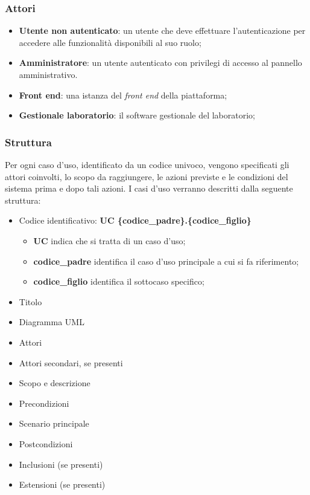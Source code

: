 \subsubsection{Attori}
\begin{itemize}
    \item \textbf{Utente non autenticato}: un utente che deve effettuare l'autenticazione per accedere alle funzionalità disponibili al suo ruolo;
    \item \textbf{Amministratore}: un utente autenticato con privilegi di accesso al pannello amministrativo.
    \item \textbf{Front end}: una istanza del \textit{front end} della piattaforma;
    \item \textbf{Gestionale laboratorio}: il software gestionale del laboratorio;
\end{itemize}
\vspace{-12pt}
\subsubsection{Struttura}
Per ogni caso d'uso, identificato da un codice univoco, vengono specificati gli attori coinvolti, lo scopo da raggiungere, le azioni previste e le condizioni del sistema prima e dopo tali azioni. I casi d'uso verranno descritti dalla seguente struttura:
\begin{itemize}
    \item Codice identificativo: \textbf{UC \{codice\_padre\}.\{codice\_figlio\}}
        \vspace{-5pt}
        \begin{itemize}
            \item \textbf{UC} indica che si tratta di un caso d'uso;
            \item \textbf{codice\_padre} identifica il caso d'uso principale a cui si fa riferimento;
            \item \textbf{codice\_figlio} identifica il sottocaso specifico;
        \end{itemize}
        \vspace{-5pt}
    \item Titolo
    \item Diagramma UML
    \item Attori
    \item Attori secondari, se presenti
    \item Scopo e descrizione
    \item Precondizioni
    \item Scenario principale
    \item Postcondizioni
    \item Inclusioni (se presenti)
    \item Estensioni (se presenti)
\end{itemize}
\vspace{-12pt}
